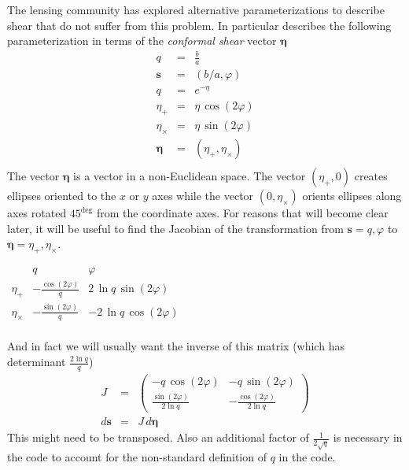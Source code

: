 \documentclass[modern]{aastex62}
\begin{document}
The lensing community has explored alternative parameterizations to describe shear that do not suffer from this problem.
In particular \citet{bernstein02} describes the following parameterization in terms of the \emph{conformal shear}  vector $\pmb{\eta}$
\begin{eqnarray}
  q & = & \frac{b}{a} \\
  \pmb{s} & = & (b/a, \varphi) \\
  q & = & e^{-\eta} \\
  \eta_+ & = & \eta \, \cos (2\varphi) \\
  \eta_\times & = & \eta \, \sin (2\varphi) \\
  \pmb{\eta} & = &  ( \eta_+, \eta_\times) \\
\end{eqnarray}
The vector $\pmb{\eta}$ is a vector in a non-Euclidean space.  The vector $( \eta_+, 0)$ creates ellipses oriented to the $x$ or $y$ axes while the vector $ (0, \eta_\times)$ orients ellipses along axes rotated $45^{\deg}$ from the coordinate axes.
For reasons that will become clear later, it will be useful to find the Jacobian of the transformation from $\pmb{s} = q, \varphi$ to $\pmb{\eta} = \eta_+, \eta_\times$.
\begin{center}
$
\begin{array}{c|cc}
 & q & \varphi \\
\hline
\eta_+           &  -\frac{\cos(2 \varphi)}{q} & 2 \, \ln q \, \sin(2 \varphi) \\
\eta_\times   & -\frac{\sin(2 \varphi)}{q}  & -2 \, \ln q \, \cos(2 \varphi) \\
\end{array}
$
\end{center}
And in fact we will usually want the inverse of this matrix (which has determinant $\frac{2\ln q}{q}$)
\begin{eqnarray}
  J  & =  & \begin{pmatrix} - q \, \cos(2\varphi) & - q \, \sin(2 \varphi) \\
    \frac{\sin(2 \varphi)}{2\ln q} & -\frac{\cos(2 \varphi)}{2\ln q}
    \end{pmatrix} \\
d\pmb{s} & = & J \, d\pmb{\eta}    
\end{eqnarray}
This might need to be transposed.  Also an additional factor of $\frac{1}{2 \sqrt{q}}$ is necessary in the code to account for the non-standard definition of $q$ in the code.
\end{document}
